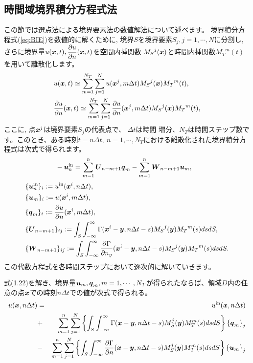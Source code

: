 \documentclass[dvipdfmx]{ampbt}
\def\bi#1{\mbox{\boldmath$#1$}}
\def\vector#1{\mbox{\boldmath $#1$}}
\begin{document}
\subsection{時間域境界積分方程式法}
この節では選点法による境界要素法の数値解法について述べます。
境界積分方程式(\ref{eq:BIE})を数値的に解くために, 境界$S$を境界要素$S_j
, j=1, \cdots ,N$に分割し, さらに境界量$\displaystyle
u(\bi{x},t),\frac{\partial u}{\partial n}(\bi{x},t)$を空間内挿関数
${M_S}^j(\bi{x})$と時間内挿関数${M_T}^m(t)$を用いて離散化します。
%
\begin{align}
&  u(\bi{x},t) \simeq \sum_{m=1}^{N_T} \sum_{j=1}^{N} u(\bi{x}^j,
  m\Delta t ) {M_S}^j(\bi{x}){M_T}^m(t), \\
&   \frac{\partial u}{\partial n}(\bi{x},t) \simeq \sum_{m=1}^{N_T} \sum_{j=1}^{N} \frac{\partial u}{\partial n}(\bi{x}^j,
  m\Delta t ) {M_S}^j(\bi{x}){M_T}^m(t),
\end{align}
ここに, 点$\bi{x}^j$は境界要素$S_j$の代表点で、 $\Delta t$は時間
増分、$N_T$は時間ステップ数です。このとき、ある時刻$t=n\Delta t,\ n = 1,
\cdots,N_T$における離散化された境界積分方程式は次式で得られます。
\begin{align}
&  -\bi{u}_n^{\rm{in}} = \sum_{m=1}^n
  \bi{U}_{n-m+1}{\bi{q}}_m -
  \sum_{m=1}^n\bi{W}_{n-m+1}\bi{u}_m,   \label{eq:risanBIE}
\end{align}
%
\begin{align}
 & \{\bi{u}_n^{\rm{in}}\}_i := u^{\rm{in}}(\bi{x}^i, n\Delta
  t), \\
 & \{\bi{u}_m\}_i := u(\bi{x}^i, m\Delta t ), \\
 & \{ {\bi{q}}_m \}_i := \frac{\partial u}{\partial n}(\bi{x}^i,m\Delta t), \\
 & \{\bi{U}_{n-m+1}\}_{ij}  := \int_{S} \int^{\infty}_{-\infty}
  \Gamma(\bi{x}^i - \bi{y},n\Delta t
  - s){M_S}^j(\bi{y}){M_T}^m(s)dsdS, \label{1jyuso}\\
 & \{\bi{W}_{n-m+1}\}_{ij}  := \int_{S} \int^{\infty}_{-\infty}
  \frac{\partial \Gamma}{\partial n_y}(\bi{x}^i - \bi{y},n\Delta t
  - s){M_S}^j(\bi{y}){M_T}^m(s)dsdS. \label{2jyuso}
\end{align}
この代数方程式を各時間ステップにおいて逐次的に解いていきます。

式(1.22)を解き、境界量$\vector{u}_m , \vector{q}_m , m=1,\cdots,N_T$が得られたならば、領域$D$内の任意の点$\vector{x}$での時刻$n \Delta t$での値が次式で得られる。
\begin{eqnarray}
u(\vector{x},n \Delta t) &=& u^{\rm{in}}(\vector{x},n \Delta t) \nonumber \\
                                         &+& \sum^{n}_{m=1} \sum^{N}_{j=1} \left\{ \int_{S} \int_{-\infty}^{\infty} \Gamma(\vector{x}-\vector{y},n \Delta t - s)M^{j}_{S}(\vector{y})
                                         M^{m}_{T}(s) ds dS \right\} \left\{ \vector{q}_{m} \right\}_{j} \nonumber \\
                                         &-& \sum^{n}_{m=1} \sum^{N}_{j=1} \left\{ \int_{S} \int_{-\infty}^{\infty} \frac{\partial \Gamma}{\partial n}(\vector{x}-\vector{y},n \Delta t - s)
                                         M^{j}_{S}(\vector{y}) M^{m}_{T}(s) ds dS \right\} \left\{ \vector{u}_{m} \right\}_{j}
\end{eqnarray}
\end{document}
